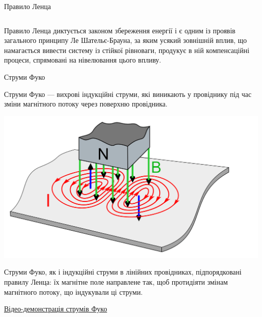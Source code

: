\documentclass[onlytextwidth]{beamer}
\begin{document}
\begin{frame}{Правило Ленца}{}
\begin{columns}
\begin{column}{0.5\linewidth}
\begin{pict}
			\end{pict}
		\end{column}
	\end{columns}
	\begin{block}{}\justifying\small
		Правило Ленца диктується законом збереження енергії і є одним із проявів загального принципу Ле Шательє-Брауна, за яким \alert{усякий зовнішній
			вплив, що намагається вивести систему із стійкої рівноваги, продукує в ній компенсаційні процеси, спрямовані на нівелювання цього впливу}.
	\end{block}
\end{frame}

\begin{frame}{Струми Фуко}{}
	\begin{block}{}\justifying
		Струми Фуко --- вихрові індукційні струми, які виникають у провіднику під час зміни магнітного потоку через поверхню провідника.
	\end{block}
	\begin{center}
		\begin{pict}
			\includegraphics[width=.5\linewidth]{Fuko_currents}
		\end{pict}
	\end{center}
	\begin{block}{}\justifying
		Струми Фуко, як і індукційні струми в лінійних провідниках, підпорядковані правилу Ленца: їх магнітне поле направлене так, щоб протидіяти змінам
		магнітного потоку, що індукували ці струми.
	\end{block}
	\begin{block}{}
		\href{https://youtu.be/MglUIiBy2lQ}{\color{blue}Відео-демонстрація струмів Фуко}
	\end{block}
\end{frame}
\end{document}
